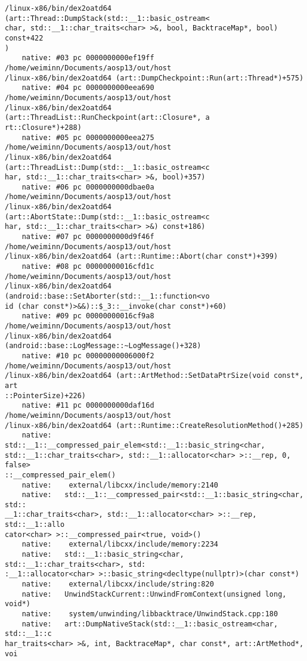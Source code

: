 \begin{lstlisting}
/linux-x86/bin/dex2oatd64 (art::Thread::DumpStack(std::__1::basic_ostream<
char, std::__1::char_traits<char> >&, bool, BacktraceMap*, bool) const+422
)
    native: #03 pc 0000000000ef19ff  /home/weiminn/Documents/aosp13/out/host
/linux-x86/bin/dex2oatd64 (art::DumpCheckpoint::Run(art::Thread*)+575)
    native: #04 pc 0000000000eea690  /home/weiminn/Documents/aosp13/out/host
/linux-x86/bin/dex2oatd64 (art::ThreadList::RunCheckpoint(art::Closure*, a
rt::Closure*)+288)
    native: #05 pc 0000000000eea275  /home/weiminn/Documents/aosp13/out/host
/linux-x86/bin/dex2oatd64 (art::ThreadList::Dump(std::__1::basic_ostream<c
har, std::__1::char_traits<char> >&, bool)+357)
    native: #06 pc 0000000000dbae0a  /home/weiminn/Documents/aosp13/out/host
/linux-x86/bin/dex2oatd64 (art::AbortState::Dump(std::__1::basic_ostream<c
har, std::__1::char_traits<char> >&) const+186)
    native: #07 pc 0000000000d9f46f  /home/weiminn/Documents/aosp13/out/host
/linux-x86/bin/dex2oatd64 (art::Runtime::Abort(char const*)+399)
    native: #08 pc 00000000016cfd1c  /home/weiminn/Documents/aosp13/out/host
/linux-x86/bin/dex2oatd64 (android::base::SetAborter(std::__1::function<vo
id (char const*)>&&)::$_3::__invoke(char const*)+60)
    native: #09 pc 00000000016cf9a8  /home/weiminn/Documents/aosp13/out/host
/linux-x86/bin/dex2oatd64 (android::base::LogMessage::~LogMessage()+328)
    native: #10 pc 00000000006000f2  /home/weiminn/Documents/aosp13/out/host
/linux-x86/bin/dex2oatd64 (art::ArtMethod::SetDataPtrSize(void const*, art
::PointerSize)+226)
    native: #11 pc 0000000000daf16d  /home/weiminn/Documents/aosp13/out/host
/linux-x86/bin/dex2oatd64 (art::Runtime::CreateResolutionMethod()+285)
    native:   std::__1::__compressed_pair_elem<std::__1::basic_string<char, 
std::__1::char_traits<char>, std::__1::allocator<char> >::__rep, 0, false>
::__compressed_pair_elem()
    native:    external/libcxx/include/memory:2140
    native:   std::__1::__compressed_pair<std::__1::basic_string<char, std::
__1::char_traits<char>, std::__1::allocator<char> >::__rep, std::__1::allo
cator<char> >::__compressed_pair<true, void>()
    native:    external/libcxx/include/memory:2234
    native:   std::__1::basic_string<char, std::__1::char_traits<char>, std:
:__1::allocator<char> >::basic_string<decltype(nullptr)>(char const*)
    native:    external/libcxx/include/string:820
    native:   UnwindStackCurrent::UnwindFromContext(unsigned long, void*)
    native:    system/unwinding/libbacktrace/UnwindStack.cpp:180
    native:   art::DumpNativeStack(std::__1::basic_ostream<char, std::__1::c
har_traits<char> >&, int, BacktraceMap*, char const*, art::ArtMethod*, voi

\end{lstlisting}
